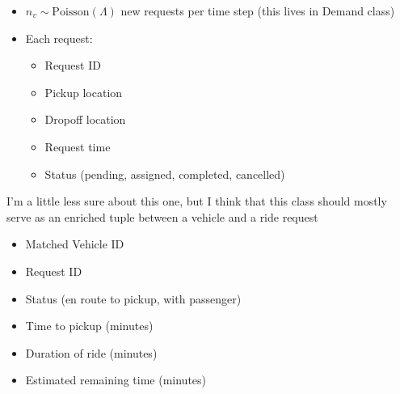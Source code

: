 \documentclass[12pt]{article}
\begin{document}
\medskip
{}
\begin{itemize}
		\item $n_v \sim \mathrm{Poisson}(\Lambda)$ new requests per time step (this lives in Demand class)
		\item Each request:
				\begin{itemize}
						\item Request ID
						\item Pickup location
						\item Dropoff location
						\item Request time
						\item Status (pending, assigned, completed, cancelled)
				\end{itemize}
\end{itemize}

\medskip
{}
I'm a little less sure about this one, but I think that this class should mostly serve as
an enriched
tuple between a vehicle and a ride request
\begin{itemize}
		\item Matched Vehicle ID
		\item Request ID
		\item Status (en route to pickup, with passenger)
		\item Time to pickup (minutes)
		\item Duration of ride (minutes)
		\item Estimated remaining time (minutes)
\end{itemize}
\end{document}
